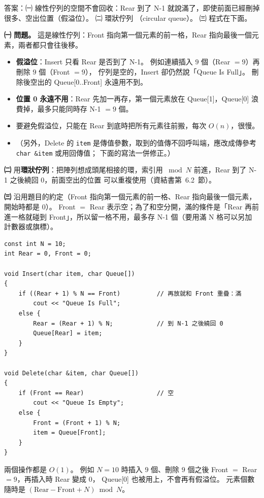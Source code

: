 \begin{pastsoln}
答案：㈠ 線性佇列的空間不會回收：Rear 到了 N-1 就說滿了，即使前面已經刪掉很多、空出位置（假溢位）。 ㈡ 環狀佇列
（circular queue）。 ㈢ 程式在下面。

\textbf{㈠ 問題。} 這是線性佇列：Front 指向第一個元素的前一格，Rear 指向最後一個元素，兩者都只會往後移。
\begin{itemize}
\item \textbf{假溢位}：Insert 只看 Rear 是否到了 N-1。 例如連續插入 $9$ 個（Rear $= 9$）再刪除 $9$ 個（Front $= 9$），
佇列是空的，Insert 卻仍然說「Queue Is Full」。 刪除後空出的 Queue[0..Front] 永遠用不到。
\item \textbf{位置 0 永遠不用}：Rear 先加一再存，第一個元素放在 Queue[1]，Queue[0] 浪費掉，最多只能同時存 N-1 $= 9$ 個。
\item 要避免假溢位，只能在 Rear 到底時把所有元素往前搬，每次 $O(n)$，很慢。
\item （另外，Delete 的 \texttt{item} 是傳值參數，取到的值傳不回呼叫端，應改成傳參考 \texttt{char \&item} 或用回傳值；
下面的寫法一併修正。）
\end{itemize}

\textbf{㈡} 用\textbf{環狀佇列}：把陣列想成頭尾相接的環，索引用 $\bmod N$ 前進，Rear 到了 N-1 之後繞回 0，前面空出的位置
可以重複使用（資結書第~6.2~節）。

\textbf{㈢} 沿用題目的約定（Front 指向第一個元素的前一格、Rear 指向最後一個元素，開始時都是 $0$）。 Front $=$ Rear
表示空；為了和空分開，滿的條件是「Rear 再前進一格就碰到 Front」，所以留一格不用，最多存 N-1 個（要用滿 N 格可以另加
計數器或旗標）。
\begin{verbatim}
const int N = 10;
int Rear = 0, Front = 0;

void Insert(char item, char Queue[])
{
    if ((Rear + 1) % N == Front)          // 再放就和 Front 重疊：滿
        cout << "Queue Is Full";
    else {
        Rear = (Rear + 1) % N;            // 到 N-1 之後繞回 0
        Queue[Rear] = item;
    }
}

void Delete(char &item, char Queue[])
{
    if (Front == Rear)                    // 空
        cout << "Queue Is Empty";
    else {
        Front = (Front + 1) % N;
        item = Queue[Front];
    }
}
\end{verbatim}
兩個操作都是 $O(1)$。 例如 $N = 10$ 時插入 $9$ 個、刪除 $9$ 個之後 Front $=$ Rear $= 9$，再插入時 Rear 變成 $0$，
Queue[0] 也被用上，不會再有假溢位。 元素個數隨時是 $(\text{Rear} - \text{Front} + N) \bmod N$。
\end{pastsoln}
